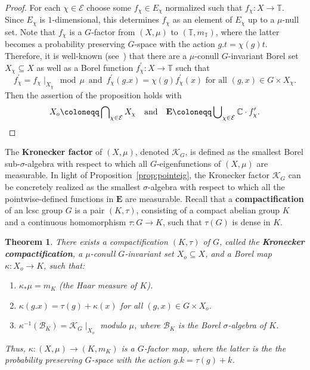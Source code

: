 \documentclass{amsart}
\numberwithin{equation}{subsection}
\newtheorem{thm}{Theorem}[section]
\theoremstyle{remark}
\begin{document}
\begin{proof}
For each \(\chi\in\mathcal{E}\) choose some \(f_{\chi}\in E_{\chi}\) normalized such that \(f_{\chi}:X\to\mathbb{T}\). Since \(E_{\chi}\) is \(1\)-dimensional, this determines \(f_{\chi}\) as an element of \(E_{\chi}\) up to a \(\mu\)-null set. Note that \(f_{\chi}\) is a \(G\)-factor from \(\left(X,\mu\right)\) to \(\left(\mathbb{T},m_{\mathbb{T}}\right)\), where the latter becomes a probability preserving \(G\)-space with the action \(g.t=\chi\left(g\right)t\). Therefore, it is well-known (see~\cite[Proposition 5.7]{AvBjCuI}) that there are a \(\mu\)-conull \(G\)-invariant Borel set \(X_{\chi}\subseteq X\) as well as a Borel function \(f_{\chi}^{\prime}:X\to\mathbb{T}\) such that
\[f_{\chi}^{\prime}=f_{\chi}\mid_{X_{\chi}}\,\operatorname{mod}\,\mu\,\text{ and }\,f_{\chi}^{\prime}\left(g.x\right)=\chi\left(g\right)f_{\chi}^{\prime}\left(x\right)\text{ for all }\left(g,x\right)\in G\times X_{\chi}.\]
Then the assertion of the proposition holds with
\[X_{o}\coloneqq\bigcap\nolimits_{\chi\in\mathcal{E}}X_{\chi}\quad\text{and}\quad\mathbf{E}\coloneqq \bigcup\nolimits_{\chi\in\mathcal{E}}\mathbb{C}\cdot f_{\chi}^{\prime}.\qedhere\]
\end{proof}

The {\bf Kronecker factor} of \(\left(X,\mu\right)\), denoted \(\mathcal{K}_{G}\), is defined as the smallest Borel sub-\(\sigma\)-algebra with respect to which all \(G\)-eigenfunctions of \(\left(X,\mu\right)\) are measurable. In light of Proposition~\ref{prop:pointeig}, the Kronecker factor \(\mathcal{K}_{G}\) can be concretely realized as the smallest \(\sigma\)-algebra with respect to which all the pointwise-defined functions in \(\mathbf{E}\) are measurable. Recall that a {\bf compactification} of an lcsc group \(G\) is a pair \(\left(K,\tau\right)\), consisting of a compact abelian group \(K\) and a continuous homomorphism \(\tau:G\to K\), such that \(\tau\left(G\right)\) is dense in \(K\).

\begin{thm}\label{thm:krongrp}
There exists a compactification \(\left(K,\tau\right)\) of \(G\), called the {\bf Kronecker compactification}, a \(\mu\)-conull \(G\)-invariant set \(X_{o}\subseteq X\), and a Borel map \(\kappa:X_{o}\to K\), such that:
\begin{enumerate}
    \item \(\kappa_{\ast}\mu=m_{K}\) (the Haar measure of \(K\)).
    \item \(\kappa\left(g.x\right)=\tau\left(g\right)+\kappa\left(x\right)\) for all \(\left(g,x\right)\in G \times X_{o}\). 
    \item \(\kappa^{-1}\left(\mathcal{B}_{K}\right)=\mathcal{K}_{G}\mid_{X_{o}}\) modulo \(\mu\), where \(\mathcal{B}_{K}\) is the Borel \(\sigma\)-algebra of \(K\).
\end{enumerate}
Thus, \(\kappa:\left(X,\mu\right)\to\left(K,m_{K}\right)\) is a \(G\)-factor map, where the latter is the the probability preserving \(G\)-space with the action \(g.k=\tau\left(g\right)+k\).
\end{thm}
\end{document}
